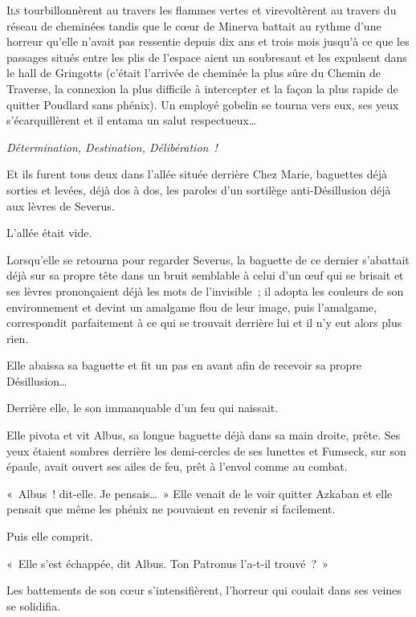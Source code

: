 
\lettrine{I}{ls} tourbillonnèrent au travers les flammes vertes et virevoltèrent au travers du réseau de cheminées tandis que le cœur de Minerva battait au rythme d'une horreur qu'elle n'avait pas ressentie depuis dix ans et trois mois jusqu'à ce que les passages situés entre les plis de l'espace aient un soubresaut et les expulsent dans le hall de Gringotts (c'était l'arrivée de cheminée la plus sûre du Chemin de Traverse, la connexion la plus difficile à intercepter et la façon la plus rapide de quitter Poudlard sans phénix).
Un employé gobelin se tourna vers eux, ses yeux s'écarquillèrent et il entama un salut respectueux…

\emph{Détermination, Destination, Délibération~!}

Et ils furent tous deux dans l'allée située derrière Chez Marie, baguettes déjà sorties et levées, déjà dos à dos, les paroles d'un sortilège anti-Désillusion déjà aux lèvres de Severus.

L'allée était vide.

Lorsqu'elle se retourna pour regarder Severus, la baguette de ce dernier s'abattait déjà sur sa propre tête dans un bruit semblable à celui d'un œuf qui se brisait et ses lèvres prononçaient déjà les mots de l'invisible~; il adopta les couleurs de son environnement et devint un amalgame flou de leur image, puis l'amalgame, correspondit parfaitement à ce qui se trouvait derrière lui et il n'y eut alors plus rien.

Elle abaissa sa baguette et fit un pas en avant afin de recevoir sa propre Désillusion…

Derrière elle, le son immanquable d'un feu qui naissait.

Elle pivota et vit Albus, sa longue baguette déjà dans sa main droite, prête.
Ses yeux étaient sombres derrière les demi-cercles de ses lunettes et Fumseck, sur son épaule, avait ouvert ses ailes de feu, prêt à l'envol comme au combat.

«~Albus~! dit-elle.
Je pensais…~»
Elle venait de le voir quitter Azkaban et elle pensait que même les phénix ne pouvaient en revenir si facilement.

Puis elle comprit.

«~Elle s'est échappée, dit Albus.
Ton Patronus l'a-t-il trouvé~?~»

Les battements de son cœur s'intensifièrent, l'horreur qui coulait dans ses veines se solidifia.

